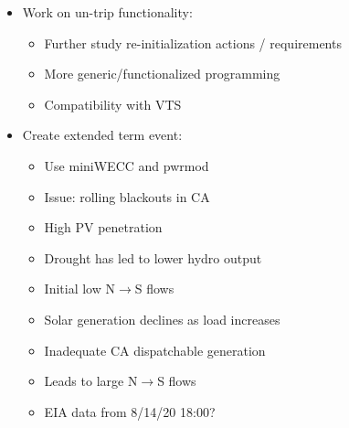\documentclass[12pt]{article}
\begin{document}
\begin{multicols}{2}
\begin{itemize}
	\item Work on un-trip functionality:
		\begin{itemize}
				\footnotesize
				\itemsep0em
				\item Further study re-initialization actions / requirements
				\item More generic/functionalized programming
				\item Compatibility with VTS
			\end{itemize}
	\item Create extended term event:
		\begin{itemize}
			\footnotesize
			\itemsep0em
			\item Use miniWECC and pwrmod
			\item Issue: rolling blackouts in CA
			\item High PV penetration
			\item Drought has led to lower hydro output
			\item Initial low N$\longrightarrow$S flows
			\item Solar generation declines as load increases %
			\item Inadequate CA dispatchable generation %
			\item Leads to large N$\longrightarrow$S flows
			\item EIA data from 8/14/20 18:00? %
		\end{itemize}
	\end{itemize}
		
\vfill\null

\end{multicols}
\end{document}
